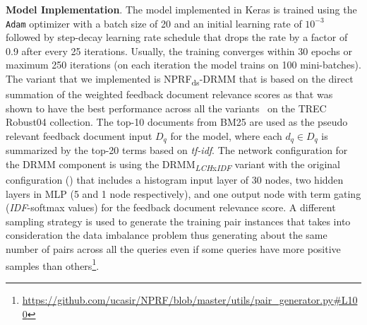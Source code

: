 \textbf{Model Implementation}. The model implemented in Keras is trained using the \texttt{Adam} optimizer with a batch size of 20 and an initial learning rate of $10^{-3}$ followed by step-decay learning rate schedule that drops the rate by a factor of 0.9 after every 25 iterations. Usually, the training converges within 30 epochs or maximum 250 iterations (on each iteration the model trains on 100 mini-batches). The variant that we implemented is NPRF\textsubscript{ds}-DRMM that is based on the direct summation of the weighted feedback document relevance scores as that was shown to have the best performance across all the variants~\citep{li2018nprf} on the TREC Robust04 collection. The top-10 documents from BM25 are used as the pseudo relevant feedback document input $D_q$ for the model, where each $d_q \in D_q$ is summarized by the top-20 terms based on \textit{tf-idf}. The network configuration for the DRMM component is using the DRMM\textsubscript{\textit{LCH}x\textit{IDF}} variant with the original configuration (\citep{Guo2016}) that includes a histogram input layer of 30 nodes, two hidden layers in MLP (5 and 1 node respectively), and one output node with term gating (\textit{IDF}-softmax values) for the feedback document relevance score. A different sampling strategy is used to generate the training pair instances that takes into consideration the data imbalance problem thus generating about the same number of pairs across all the queries even if some queries have more positive samples than others\footnote{\url{https://github.com/ucasir/NPRF/blob/master/utils/pair_generator.py\#L100}}.

